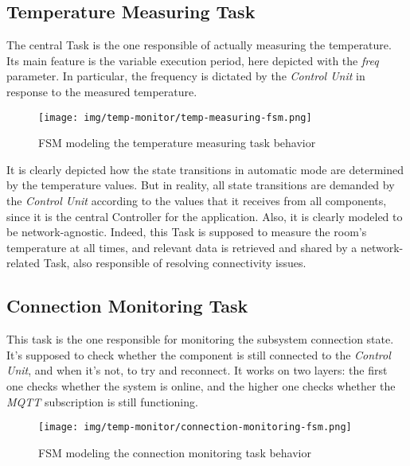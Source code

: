 \documentclass[a4paper,12pt]{report}
\begin{document}
		\subsection{Temperature Measuring Task}
		The central Task is the one responsible of actually measuring the temperature. Its main feature is the variable execution period, here depicted with the \textit{freq} parameter. In particular, the frequency is dictated by the \textit{Control Unit} in response to the measured temperature.
		\begin{figure}[H]
			\centering{}
			\texttt{[image: img/temp-monitor/temp-measuring-fsm.png]}
			\caption{FSM modeling the temperature measuring task behavior}
			\label{img:temp-monitor/temp-measuring-fsm}
		\end{figure}
		It is clearly depicted how the state transitions in automatic mode are determined by the temperature values. But in reality, all state transitions are demanded by the \textit{Control Unit} according to the values that it receives from all components, since it is the central Controller for the application.
		\newline Also, it is clearly modeled to be network-agnostic. Indeed, this Task is supposed to measure the room's temperature at all times, and relevant data is retrieved and shared by a network-related Task, also responsible of resolving connectivity issues.
		\subsection{Connection Monitoring Task}
		This task is the one responsible for monitoring the subsystem connection state. It's supposed to check whether the component is still connected to the \textit{Control Unit}, and when it's not, to try and reconnect. It works on two layers: the first one checks whether the system is online, and the higher one checks whether the \textit{MQTT} subscription is still functioning.
		\begin{figure}[H]
			\centering{}
			\texttt{[image: img/temp-monitor/connection-monitoring-fsm.png]}
			\caption{FSM modeling the connection monitoring task behavior}
			\label{img:temp-monitor/connection-monitoring-fsm}
		\end{figure}
\end{document}
